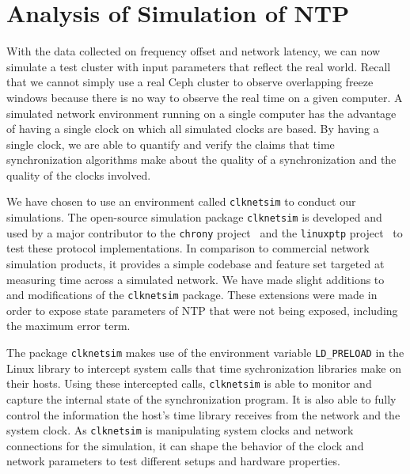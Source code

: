         



\section{Analysis of Simulation of NTP}

With the data collected on frequency offset and network latency, we
can now simulate a test cluster with input parameters that reflect the
real world. Recall that we cannot simply use a real Ceph
cluster to observe overlapping freeze windows because there is no
way to observe the real time on a given computer. A simulated network
environment running on a single computer has the advantage of having a
single clock on which all simulated clocks are based. By having a
single clock, we are able to quantify and verify the claims that time
synchronization algorithms make about the quality of a synchronization
and the quality of the clocks involved.

We have chosen to use an environment called
\texttt{clknetsim} %
to conduct our simulations. The open-source simulation package
\texttt{clknetsim} is developed and used by a major contributor to the
\texttt{chrony} project~\citep{chrony} and the \texttt{linuxptp}
project~\citep{linuxptp} to test these protocol implementations. In
comparison to commercial network simulation products, it provides a
simple codebase and feature set targeted at measuring time across a
simulated network. We have made slight additions to and modifications
of the \texttt{clknetsim} package. These extensions were made in order
to expose state parameters of NTP that were not being exposed,
including the maximum error term.

The package \texttt{clknetsim} makes use of the environment variable
\texttt{LD\_PRELOAD} in the Linux library to intercept system calls
that time sychronization libraries make on their hosts. Using these
intercepted calls, \texttt{clknetsim} is able to monitor and capture
the internal state of the synchronization program. It is also able to
fully control the information the host's time library receives from
the network and the system clock. As \texttt{clknetsim} is
manipulating system clocks and network connections for the simulation,
it can shape the behavior of the clock and network parameters to test
different setups and hardware properties.

